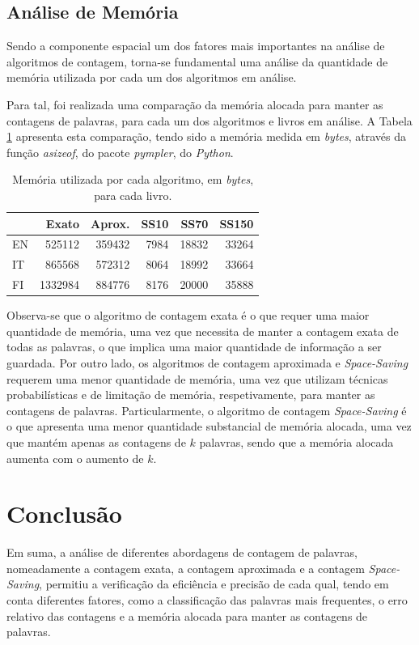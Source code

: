 \documentclass[mirror, portugues]{revdetua}
\begin{document}
\subsection{Análise de Memória}

Sendo a componente espacial um dos fatores mais importantes na análise de algoritmos de contagem, torna-se fundamental uma análise da quantidade de memória utilizada por cada um dos algoritmos em análise.

Para tal, foi realizada uma comparação da memória alocada para manter as contagens de palavras, para cada um dos algoritmos e livros em análise. A Tabela \ref{table:memoria} apresenta esta comparação, tendo sido a memória medida em \textit{bytes}, através da função \textit{asizeof}, do pacote \textit{pympler}, do \textit{Python}.

\begin{table}[H]
\centering
\caption{Memória utilizada por cada algoritmo, em \textit{bytes}, para cada livro.}
\label{table:memoria}
\begin{tabular}{lrrrrr}
\toprule
& Exato & Aprox. & SS10 & SS70 & SS150 \\
\midrule
EN & 525112 & 359432 & 7984 & 18832 & 33264 \\
IT & 865568 & 572312 & 8064 & 18992 & 33664 \\
FI &1332984 & 884776 & 8176 & 20000 & 35888 \\
\bottomrule
\end{tabular}
\end{table}

Observa-se que o algoritmo de contagem exata é o que requer uma maior quantidade de memória, uma vez que necessita de manter a contagem exata de todas as palavras, o que implica uma maior quantidade de informação a ser guardada. Por outro lado, os algoritmos de contagem aproximada e \textit{Space-Saving} requerem uma menor quantidade de memória, uma vez que utilizam técnicas probabilísticas e de limitação de memória, respetivamente, para manter as contagens de palavras. Particularmente, o algoritmo de contagem \textit{Space-Saving} é o que apresenta uma menor quantidade substancial de memória alocada, uma vez que mantém apenas as contagens de $k$ palavras, sendo que a memória alocada aumenta com o aumento de $k$.

\section{Conclusão}

Em suma, a análise de diferentes abordagens de contagem de palavras, nomeadamente a contagem exata, a contagem aproximada e a contagem \textit{Space-Saving}, permitiu a verificação da eficiência e precisão de cada qual, tendo em conta diferentes fatores, como a classificação das palavras mais frequentes, o erro relativo das contagens e a memória alocada para manter as contagens de palavras.
\end{document}

